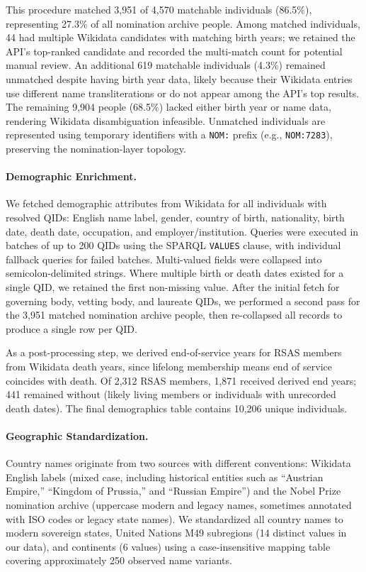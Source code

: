 \documentclass[12pt]{article}
\begin{document}
This procedure matched 3,951 of 4,570 matchable individuals (86.5\%), representing 27.3\% of all nomination archive people. Among matched individuals, 44 had multiple Wikidata candidates with matching birth years; we retained the API's top-ranked candidate and recorded the multi-match count for potential manual review. An additional 619 matchable individuals (4.3\%) remained unmatched despite having birth year data, likely because their Wikidata entries use different name transliterations or do not appear among the API's top results. The remaining 9,904 people (68.5\%) lacked either birth year or name data, rendering Wikidata disambiguation infeasible. Unmatched individuals are represented using temporary identifiers with a \texttt{NOM:} prefix (e.g., \texttt{NOM:7283}), preserving the nomination-layer topology.

\paragraph*{Demographic Enrichment.}

We fetched demographic attributes from Wikidata for all individuals with resolved QIDs: English name label, gender, country of birth, nationality, birth date, death date, occupation, and employer/institution. Queries were executed in batches of up to 200 QIDs using the SPARQL \texttt{VALUES} clause, with individual fallback queries for failed batches. Multi-valued fields were collapsed into semicolon-delimited strings. Where multiple birth or death dates existed for a single QID, we retained the first non-missing value. After the initial fetch for governing body, vetting body, and laureate QIDs, we performed a second pass for the 3,951 matched nomination archive people, then re-collapsed all records to produce a single row per QID.

As a post-processing step, we derived end-of-service years for RSAS members from Wikidata death years, since lifelong membership means end of service coincides with death. Of 2,312 RSAS members, 1,871 received derived end years; 441 remained without (likely living members or individuals with unrecorded death dates). The final demographics table contains 10,206 unique individuals.

\paragraph*{Geographic Standardization.}

Country names originate from two sources with different conventions: Wikidata English labels (mixed case, including historical entities such as ``Austrian Empire,'' ``Kingdom of Prussia,'' and ``Russian Empire'') and the Nobel Prize nomination archive (uppercase modern and legacy names, sometimes annotated with ISO codes or legacy state names). We standardized all country names to modern sovereign states, United Nations M49 subregions (14 distinct values in our data), and continents (6 values) using a case-insensitive mapping table covering approximately 250 observed name variants.
\end{document}
